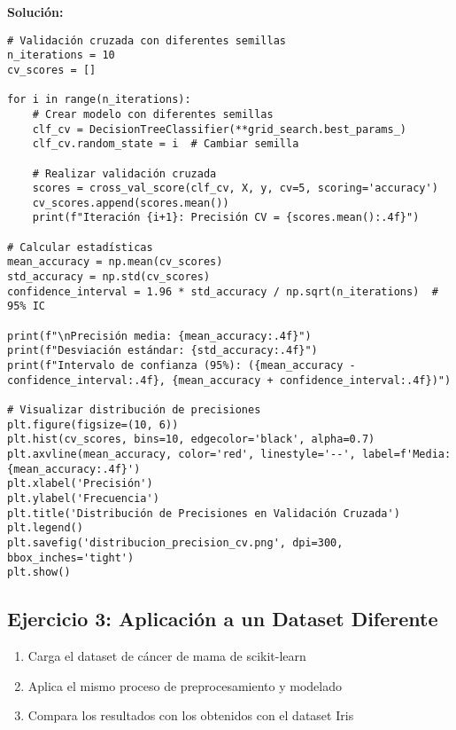 \documentclass[12pt]{article}
\begin{document}
\textbf{Solución:}
\begin{lstlisting}
# Validación cruzada con diferentes semillas
n_iterations = 10
cv_scores = []

for i in range(n_iterations):
    # Crear modelo con diferentes semillas
    clf_cv = DecisionTreeClassifier(**grid_search.best_params_)
    clf_cv.random_state = i  # Cambiar semilla
    
    # Realizar validación cruzada
    scores = cross_val_score(clf_cv, X, y, cv=5, scoring='accuracy')
    cv_scores.append(scores.mean())
    print(f"Iteración {i+1}: Precisión CV = {scores.mean():.4f}")

# Calcular estadísticas
mean_accuracy = np.mean(cv_scores)
std_accuracy = np.std(cv_scores)
confidence_interval = 1.96 * std_accuracy / np.sqrt(n_iterations)  # 95% IC

print(f"\nPrecisión media: {mean_accuracy:.4f}")
print(f"Desviación estándar: {std_accuracy:.4f}")
print(f"Intervalo de confianza (95%): ({mean_accuracy - confidence_interval:.4f}, {mean_accuracy + confidence_interval:.4f})")

# Visualizar distribución de precisiones
plt.figure(figsize=(10, 6))
plt.hist(cv_scores, bins=10, edgecolor='black', alpha=0.7)
plt.axvline(mean_accuracy, color='red', linestyle='--', label=f'Media: {mean_accuracy:.4f}')
plt.xlabel('Precisión')
plt.ylabel('Frecuencia')
plt.title('Distribución de Precisiones en Validación Cruzada')
plt.legend()
plt.savefig('distribucion_precision_cv.png', dpi=300, bbox_inches='tight')
plt.show()
\end{lstlisting}

\subsection{Ejercicio 3: Aplicación a un Dataset Diferente}
\begin{enumerate}
    \item Carga el dataset de cáncer de mama de scikit-learn
    \item Aplica el mismo proceso de preprocesamiento y modelado
    \item Compara los resultados con los obtenidos con el dataset Iris
\end{enumerate}
\end{document}
